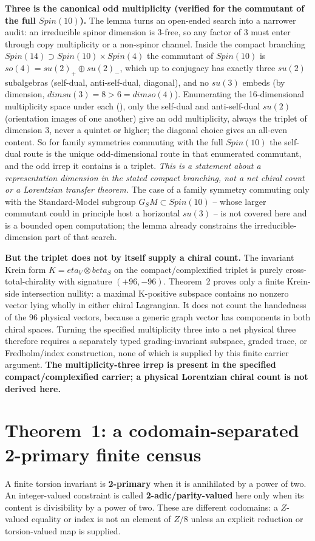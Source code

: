 \documentclass[11pt]{article}
\theoremstyle{remark}
\begin{document}
\textbf{Three is the canonical odd multiplicity (verified for the commutant of the full $Spin(10)$).} The lemma turns an open-ended search into a narrower audit: an irreducible spinor dimension is 3-free, so any factor of 3 must enter through copy multiplicity or a non-spinor channel. Inside the compact branching $Spin(14) \supset Spin(10) \times Spin(4)$ the commutant of $Spin(10)$ is $so(4) = su(2)_+ \oplus su(2)_-$, which up to conjugacy has exactly three $su(2)$ subalgebras (self-dual, anti-self-dual, diagonal), and no $su(3)$ embeds (by dimension, $dim su(3) = 8 > 6 = dim so(4)$). Enumerating the 16-dimensional multiplicity space under each (), only the self-dual and anti-self-dual $su(2)$ (orientation images of one another) give an odd multiplicity, always the triplet of dimension 3, never a quintet or higher; the diagonal choice gives an all-even content. So for family symmetries commuting with the full $Spin(10)$ the self-dual route is the unique odd-dimensional route in that enumerated commutant, and the odd irrep it contains is a triplet. \emph{This is a statement about a representation dimension in the stated compact branching, not a net chiral count or a Lorentzian transfer theorem.} The case of a family symmetry commuting only with the Standard-Model subgroup $G_SM \subset Spin(10)$ -- whose larger commutant could in principle host a horizontal $su(3)$ -- is not covered here and is a bounded open computation; the lemma already constrains the irreducible-dimension part of that search.

\textbf{But the triplet does not by itself supply a chiral count.} The invariant Krein form $K = eta_V \otimes beta_S$ on the compact/complexified triplet is purely cross-total-chirality with signature $(+96, -96)$. Theorem~2 proves only a finite Krein-side intersection nullity: a maximal K-positive subspace contains no nonzero vector lying wholly in either chiral Lagrangian. It does not count the handedness of the 96 physical vectors, because a generic graph vector has components in both chiral spaces. Turning the specified multiplicity three into a net physical three therefore requires a separately typed grading-invariant subspace, graded trace, or Fredholm/index construction, none of which is supplied by this finite carrier argument. \textbf{The multiplicity-three irrep is present in the specified compact/complexified carrier; a physical Lorentzian chiral count is not derived here.}

\section{Theorem~1: a codomain-separated 2-primary finite census}
A finite torsion invariant is \textbf{2-primary} when it is annihilated by a power of two. An integer-valued constraint is called \textbf{2-adic/parity-valued} here only when its content is divisibility by a power of two. These are different codomains: a $Z$-valued equality or index is not an element of $Z/8$ unless an explicit reduction or torsion-valued map is supplied.
\end{document}
